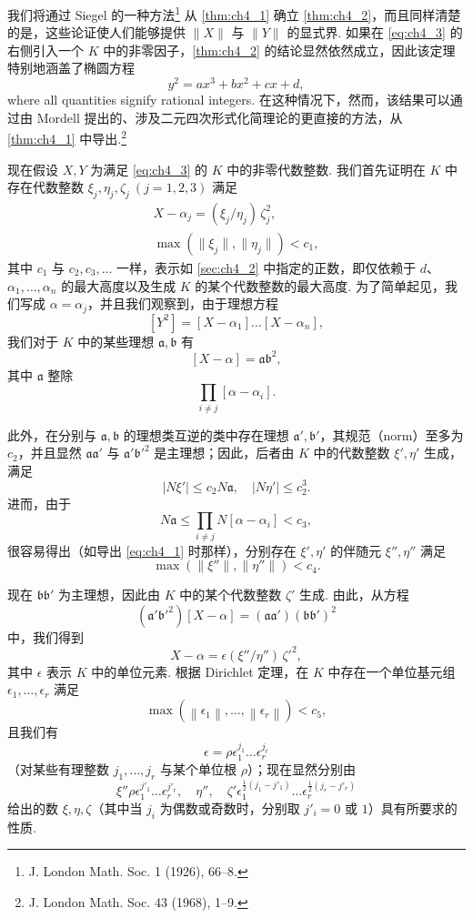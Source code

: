 我们将通过 Siegel 的一种方法\footnote{J. London Math. Soc. 1 (1926), 66--8.} 从 \autoref{thm:ch4_1} 确立 \autoref{thm:ch4_2}，而且同样清楚的是，这些论证使人们能够提供 $\|X\|$ 与 $\|Y\|$ 的显式界. 如果在 \eqref{eq:ch4_3} 的右侧引入一个 $K$ 中的非零因子，\autoref{thm:ch4_2} 的结论显然依然成立，因此该定理特别地涵盖了椭圆方程
\[
y^2 = ax^3 + bx^2 + cx + d,
\]
where all quantities signify rational integers. 在这种情况下，然而，该结果可以通过由 Mordell 提出的、涉及二元四次形式化简理论的更直接的方法，从 \autoref{thm:ch4_1} 中导出.\footnote{J. London Math. Soc. 43 (1968), 1--9.}

现在假设 $X, Y$ 为满足 \eqref{eq:ch4_3} 的 $K$ 中的非零代数整数. 我们首先证明在 $K$ 中存在代数整数 $\xi_j, \eta_j, \zeta_j \ (j=1,2,3)$ 满足
\begin{equation} \label{eq:ch4_4}\tag{4}
\begin{gathered}
X - \alpha_j = (\xi_j/\eta_j) \, \zeta_j^2, \\
\max (\|\xi_j\|, \|\eta_j\|) < c_1,
\end{gathered}
\end{equation}
其中 $c_1$ 与 $c_2, c_3, \dots$ 一样，表示如 \autoref{sec:ch4_2} 中指定的正数，即仅依赖于 $d$、$\alpha_1, \dots, \alpha_n$ 的最大高度以及生成 $K$ 的某个代数整数的最大高度. 为了简单起见，我们写成 $\alpha = \alpha_j$，并且我们观察到，由于理想方程
\[
[Y^2] = [X - \alpha_1] \dots [X - \alpha_n],
\]
我们对于 $K$ 中的某些理想 $\mathfrak{a, b}$ 有
\[
[X - \alpha] = \mathfrak{ab}^2,
\]
其中 $\mathfrak{a}$ 整除
\[
\prod_{i \neq j} [\alpha - \alpha_i].
\]

此外，在分别与 $\mathfrak{a, b}$ 的理想类互逆的类中存在理想 $\mathfrak{a', b'}$，其规范（norm）至多为 $c_2$，并且显然 $\mathfrak{aa'}$ 与 $\mathfrak{a'b'^2}$ 是主理想；因此，后者由 $K$ 中的代数整数 $\xi', \eta'$ 生成，满足
\[
|N\xi'| \le c_2 N\mathfrak{a}, \quad |N\eta'| \le c_2^3.
\]
进而，由于
\[
N\mathfrak{a} \le \prod_{i \neq j} N[\alpha - \alpha_i] < c_3,
\]
很容易得出（如导出 \eqref{eq:ch4_1} 时那样），分别存在 $\xi', \eta'$ 的伴随元 $\xi'', \eta''$ 满足
\[
\max(\|\xi''\|, \|\eta''\|) < c_4.
\]

现在 $\mathfrak{bb'}$ 为主理想，因此由 $K$ 中的某个代数整数 $\zeta'$ 生成. 由此，从方程
\[
(\mathfrak{a'b'^2})[X-\alpha] = (\mathfrak{aa'})(\mathfrak{bb'})^2
\]
中，我们得到
\[
X-\alpha=\epsilon(\xi''/\eta'')\,\zeta'^2,
\]
其中 $\epsilon$ 表示 $K$ 中的单位元素. 根据 Dirichlet 定理，在 $K$ 中存在一个单位基元组 $\epsilon_1, \dots, \epsilon_r$ 满足
\[
\max \left(\left\| \epsilon_1 \right\|, \dots, \left\| \epsilon_r \right\| \right) < c_5,
\]
且我们有
\[
\epsilon = \rho \epsilon_1^{j_1} \dots \epsilon_r^{j_r}
\]
（对某些有理整数 $j_1, \dots, j_r$ 与某个单位根 $\rho$）；现在显然分别由
\[
\xi'' \rho \epsilon_1^{j'_1} \dots \epsilon_r^{j'_r}, \quad \eta'', \quad \zeta' \epsilon_1^{\frac{1}{2}(j_1-j'_1)} \dots \epsilon_r^{\frac{1}{2}(j_r-j'_r)}
\]
给出的数 $\xi, \eta, \zeta$（其中当 $j_i$ 为偶数或奇数时，分别取 $j'_i = 0$ 或 $1$）具有所要求的性质.

